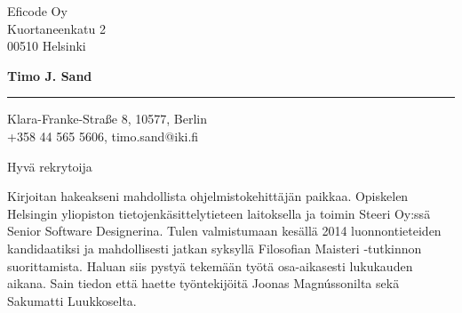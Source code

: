 \documentclass{letter} %
\begin{document}
\signature{Timo J. Sand}           %
\longindentation=0pt                       %
\let\raggedleft\raggedright                %


\begin{letter}{%
 Eficode Oy \\
Kuortaneenkatu 2 \\
00510 Helsinki
}

\begin{flushleft}
{\large\bf Timo J. Sand}
\end{flushleft}
\medskip\hrule height 1pt
\begin{flushright}
\hfill Klara-Franke-Straße 8, 10577, Berlin \\
\hfill +358 44 565 5606, timo.sand@iki.fi
\end{flushright}
\vfill %


\opening{Hyvä rekrytoija}


\noindent
Kirjoitan hakeakseni mahdollista ohjelmistokehittäjän paikkaa.
Opiskelen Helsingin yliopiston tietojenkäsittelytieteen laitoksella ja toimin Steeri Oy:ssä Senior Software Designerina. Tulen valmistumaan kesällä 2014 luonnontieteiden kandidaatiksi ja mahdollisesti jatkan syksyllä Filosofian Maisteri -tutkinnon suorittamista. Haluan siis pystyä tekemään työtä osa-aikasesti lukukauden aikana. Sain tiedon että haette työntekijöitä Joonas Magnússonilta sekä Sakumatti Luukkoselta.


\noindent


\end{letter}
\end{document}
